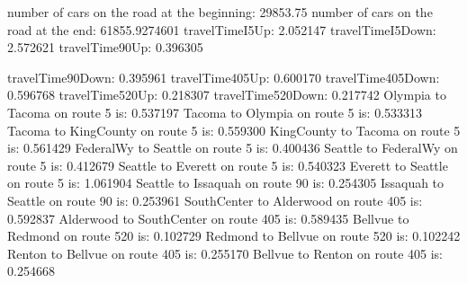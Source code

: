 number of cars on the road at the beginning:
29853.75
number of cars on the road at the end:
61855.9274601
travelTimeI5Up: 2.052147
travelTimeI5Down: 2.572621
travelTime90Up: 0.396305

travelTime90Down: 0.395961
travelTime405Up: 0.600170
travelTime405Down: 0.596768
travelTime520Up: 0.218307
travelTime520Down: 0.217742
Olympia to Tacoma on route 5 is: 0.537197
Tacoma to Olympia on route 5 is: 0.533313
Tacoma to KingCounty on route 5 is: 0.559300
KingCounty to Tacoma on route 5 is: 0.561429
FederalWy to Seattle on route 5 is: 0.400436
Seattle to FederalWy on route 5 is: 0.412679
Seattle to Everett on route 5 is: 0.540323
Everett to Seattle on route 5 is: 1.061904
Seattle to Issaquah on route 90 is: 0.254305
Issaquah to Seattle on route 90 is: 0.253961
SouthCenter to Alderwood on route 405 is: 0.592837
Alderwood to SouthCenter on route 405 is: 0.589435
Bellvue to Redmond on route 520 is: 0.102729
Redmond to Bellvue on route 520 is: 0.102242
Renton to Bellvue on route 405 is: 0.255170
Bellvue to Renton on route 405 is: 0.254668